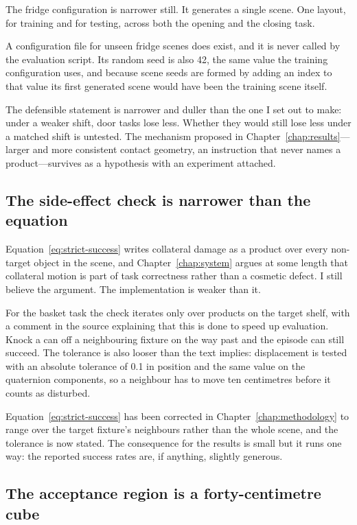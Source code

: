 The fridge configuration is narrower still. It generates a single scene. One layout, for training and for testing, across both the opening and the closing task.

A configuration file for unseen fridge scenes does exist, and it is never called by the evaluation script. Its random seed is also 42, the same value the training configuration uses, and because scene seeds are formed by adding an index to that value its first generated scene would have been the training scene itself.

The defensible statement is narrower and duller than the one I set out to make: under a weaker shift, door tasks lose less. Whether they would still lose less under a matched shift is untested. The mechanism proposed in Chapter~\ref{chap:results}---larger and more consistent contact geometry, an instruction that never names a product---survives as a hypothesis with an experiment attached.

\subsection*{The side-effect check is narrower than the equation}

Equation~\ref{eq:strict-success} writes collateral damage as a product over every non-target object in the scene, and Chapter~\ref{chap:system} argues at some length that collateral motion is part of task correctness rather than a cosmetic defect. I still believe the argument. The implementation is weaker than it.

For the basket task the check iterates only over products on the target shelf, with a comment in the source explaining that this is done to speed up evaluation. Knock a can off a neighbouring fixture on the way past and the episode can still succeed. The tolerance is also looser than the text implies: displacement is tested with an absolute tolerance of 0.1 in position and the same value on the quaternion components, so a neighbour has to move ten centimetres before it counts as disturbed.

Equation~\ref{eq:strict-success} has been corrected in Chapter~\ref{chap:methodology} to range over the target fixture's neighbours rather than the whole scene, and the tolerance is now stated. The consequence for the results is small but it runs one way: the reported success rates are, if anything, slightly generous.

\subsection*{The acceptance region is a forty-centimetre cube}

